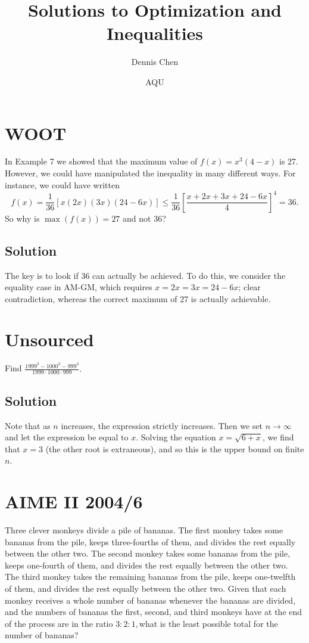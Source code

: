 \documentclass[mast]{lucky}
\title{Solutions to Optimization and Inequalities}
\author{Dennis Chen}
\date{AQU}
\begin{document}
\maketitle

\toc

\pagebreak\section{WOOT}

In Example 7 we showed that the maximum value of $f(x)=x^3(4-x)$ is 27. However, we could have manipulated the inequality in many different ways. For instance, we could have written \[f(x)=\frac 1{36}[x(2x)(3x)(24-6x)]\le\frac1{36}\left[\frac{x+2x+3x+24-6x}4\right]^4=36.\] So why is $\max(f(x))=27$ and not 36?

\subsection{Solution}

The key is to look if 36 can actually be achieved. To do this, we consider the equality case in AM-GM, which requires $x=2x=3x=24-6x$; clear contradiction, whereas the correct maximum of 27 is actually achievable.

\pagebreak\section{Unsourced}

Find $\frac{1999^3-1000^3-999^3}{1999\cdot 1000\cdot 999}.$

\subsection{Solution}

Note that as $n$ increases, the expression strictly increases. Then we set $n\to\infty$ and let the expression be equal to $x$. Solving the equation $x=\sqrt{6+x}$, we find that $x=3$ (the other root is extraneous), and so this is the upper bound on finite $n$.

\pagebreak\section{AIME II 2004/6}
Three clever monkeys divide a pile of bananas. The first monkey takes some bananas from the pile, keeps three-fourths of them, and divides the rest equally between the other two. The second monkey takes some bananas from the pile, keeps one-fourth of them, and divides the rest equally between the other two. The third monkey takes the remaining bananas from the pile, keeps one-twelfth of them, and divides the rest equally between the other two. Given that each monkey receives a whole number of bananas whenever the bananas are divided, and the numbers of bananas the first, second, and third monkeys have at the end of the process are in the ratio $3: 2: 1,$what is the least possible total for the number of bananas?
\end{document}
